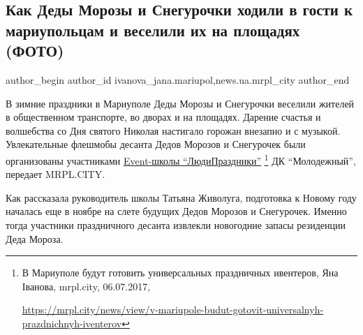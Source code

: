  
 
 
 
 
 
\subsection{Как Деды Морозы и Снегурочки ходили в гости к мариупольцам и веселили их на площадях (ФОТО)}
\label{sec:17_01_2018.stz.news.ua.mrpl_city.1.dedy_morozy_snegurochki}
 
\ifcmt
 author_begin
   author_id ivanova_jana.mariupol,news.ua.mrpl_city
 author_end
\fi

В зимние праздники в Мариуполе Деды Морозы и Снегурочки веселили жителей в
общественном транспорте, во дворах и на площадях. Дарение счастья и волшебства
со Дня святого Николая настигало горожан внезапно и с музыкой. Увлекательные
флешмобы десанта Дедов Морозов и Снегурочек были организованы участниками
\href{https://mrpl.city/news/view/v-mariupole-budut-gotovit-universalnyh-prazdnichnyh-iventerov}{Event-школы \enquote{ЛюдиПраздники}}%
\footnote{В Мариуполе будут готовить универсальных праздничных ивентеров, Яна Іванова, mrpl.city, 06.07.2017, \par%
\url{https://mrpl.city/news/view/v-mariupole-budut-gotovit-universalnyh-prazdnichnyh-iventerov}
}
ДК \enquote{Молодежный}, передает MRPL.CITY.

Как рассказала руководитель школы Татьяна Живолуга, подготовка к Новому году
началась еще в ноябре на слете будущих Дедов Морозов и Снегурочек. Именно тогда
участники праздничного десанта извлекли новогодние запасы резиденции Деда
Мороза.

